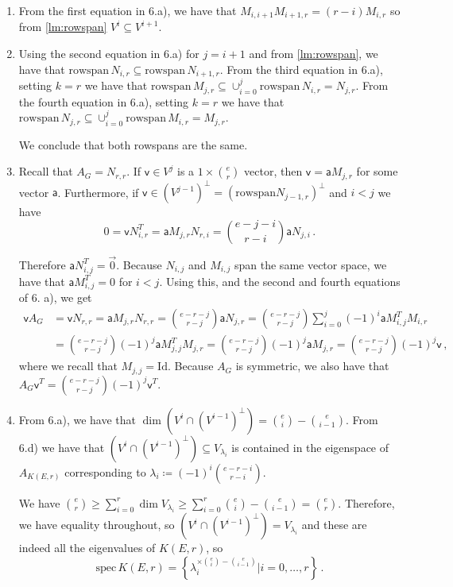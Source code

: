 \documentclass[kulak]{tplt}
\theoremstyle{definition}
\newcommand{\vv}{\mathsf{v}}
\newcommand{\va}{\mathsf{a}}
\newcommand{\rowspn}{\mathrm{rowspan}}
\newcommand{\Id}{\mathrm{Id}}
\newcommand{\spec}{\mathrm{spec}}
\begin{document}
\begin{enumerate}
\begin{enumerate}
\item 

From the first equation in 6.a), we have that $M_{i, i+1} M_{i+1, r} = (r-i)M_{i, r}$ so from \cref{lm:rowspan} $V^{i} \subseteq V^{i+1}$. 

\item
Using the second equation in 6.a) for $j = i+1$ and from \cref{lm:rowspan}, we have that $\rowspn \,N_{i, r} \subseteq \rowspn \, N_{i+1, r}$.
From the third equation in 6.a), setting $k = r$ we have that $\rowspn \, M_{j, r} \subseteq \cup_{i=0}^j \rowspn \, N_{i, r} = N_{j, r}$.
From the fourth equation in 6.a), setting $k = r$ we have that $\rowspn \, N_{j, r} \subseteq \cup_{i=0}^j \rowspn \, M_{i, r} = M_{j, r}$.

We conclude that both rowspans are the same.


\item
Recall that $A_G = N_{r, r}$.
If $\vv \in V^j$ is a $1 \times \binom{e}{r}$ vector, then $\vv = \va M_{j, r}$  for some vector $\va$.
Furthermore, if $\vv \in (V^{j-1})^{\perp} = (\rowspn N_{j-1, r})^{\perp} $ and $i < j$ we have
$$ 0 =  \vv N_{i, r}^T = \va M_{j, r} N_{r, i} = \binom{e-j-i}{r-i} \va N_{j, i}\, . $$

Therefore $\va N_{i, j}^T = \vec{0}$.
Because $N_{i, j}$ and $M_{i, j}$ span the same vector space, we have that $\va M_{i, j}^T = 0 $ for $i <j$.
Using this, and the second and fourth equations of 6. a), we get
\begin{align*}
\vv A_G &= \vv N_{r, r} = \va M_{j, r} N_{r, r} = \binom{e-r-j}{r-j}\va N_{j, r} = \binom{e-r-j}{r-j} \sum_{i=0}^j (-1)^i \va M_{i, j}^T M_{i, r}\\
&= \binom{e-r-j}{r-j} (-1)^j \va M_{j, j}^T M_{j, r} = \binom{e-r-j}{r-j} (-1)^j \va M_{j, r} = \binom{e-r-j}{r-j} (-1)^j \vv \,  ,
\end{align*}
where we recall that $M_{j, j} = \Id$.
Because $A_G$ is symmetric, we also have that $A_G \vv^T = \binom{e-r-j}{r-j} (-1)^j \vv^T$.

\item 
From 6.a), we have that $\dim (V^i \cap (V^{i-1})^{\perp}) = \binom{e}{i}-\binom{e}{i-1}$.
From 6.d) we have that $(V^i \cap (V^{i-1})^{\perp}) \subseteq V_{\lambda_i}$ is contained in the eigenspace of $A_{K(E, r)}$ corresponding to $ \lambda_i \coloneqq (-1)^i\binom{e-r-i}{r-i}$.

We have $\binom{e}{r} \geq \sum_{i=0}^r \dim V_{\lambda_i} \geq \sum_{i=0}^r \binom{e}{i}-\binom{e}{i-1} = \binom{e}{r}$.
Therefore, we have equality throughout, so $(V^i \cap (V^{i-1})^{\perp}) = V_{\lambda_i}$ and these are indeed all the eigenvalues of $K(E, r)$, so
$$\spec \, K(E, r) = \left\{  \lambda_i^{\times \binom{e}{i} - \binom{e}{i-1}} \Big| i = 0, \ldots, r\right\} \, . $$
\end{enumerate}

\end{enumerate}
\end{document}
